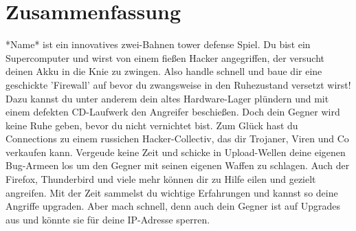 \section{Zusammenfassung}


*Name* ist ein innovatives zwei-Bahnen tower defense Spiel.
Du bist ein Supercomputer und wirst von einem fießen Hacker angegriffen, der versucht deinen Akku in die Knie zu zwingen.
Also handle schnell und baue dir eine geschickte 'Firewall' auf bevor du zwangsweise in den Ruhezustand versetzt wirst!
Dazu kannst du unter anderem dein altes Hardware-Lager plündern und mit einem defekten CD-Laufwerk den Angreifer beschießen.
Doch dein Gegner wird keine Ruhe geben, bevor du nicht vernichtet bist.
Zum Glück hast du Connections zu einem russichen Hacker-Collectiv, das dir Trojaner, Viren und Co verkaufen kann. Vergeude keine Zeit und schicke in Upload-Wellen deine eigenen Bug-Armeen los um den Gegner mit seinen eigenen Waffen zu schlagen.
Auch der Firefox, Thunderbird und viele mehr können dir zu Hilfe eilen und gezielt angreifen.
Mit der Zeit sammelst du wichtige Erfahrungen und kannst so deine Angriffe upgraden. Aber mach schnell, denn auch dein Gegner ist auf Upgrades aus und könnte sie für deine IP-Adresse sperren.
